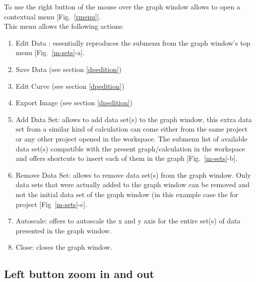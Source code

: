 To use the right button of the mouse over the graph window allows to open a contextual menu [Fig.~\ref{rmenu}].\\
\laf This menu allows the following actions:
\begin{enumerate}
\item\label{ed} Edit Data : essentially reproduces the  submenu from the graph window's top menu [Fig.~\ref{m-sets}-a]. 
\item\label{sd} Save Data (see section \ref{dpedition})
\item\label{ec} Edit Curve (see section \ref{dpedition})
\item\label{ei} Export Image (see section \ref{dpedition})
\item\label{ad} Add Data Set: allows to add data set(s) to the graph window, this extra data set from a similar kind of calculation can come either from the same project or any other project opened in the workspace. The submenu list of available data set(s) compatible with the present graph/calculation in the workspace and offers shortcuts to insert each of them in the graph [Fig.~\ref{m-sets}-b]. 
\item\label{rd} Remove Data Set: allows to remove data set(s) from the graph window. Only data sets that were actually added to the graph window can be removed and not the initial data set of the graph window (in this example case the  for  project [Fig~\ref{m-sets}-c]. 
\item\label{au} Autoscale: offers to autoscale the x and y axis for the entire set(s) of data presented in the graph window. 
\item\label{cl} Close: closes the graph window.
\end{enumerate}
\setsfig
\clearpage

\subsection{Left button zoom in and out}

